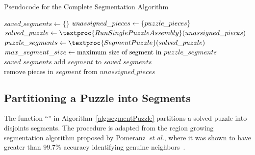 \begin{algorithm}[tb]
\caption{Pseudocode for the Complete Segmentation Algorithm}\label{alg:segmentation}
\begin{algorithmic}[1]
    \State $saved\_segments \gets \{ \}$
    \State $unassigned\_pieces \gets \{ puzzle\hspace{-0.8pt}\_pieces \}$
    \Loop
        \State $solved\_puzzle \gets \textproc{RunSinglePuzzleAssembly}(unassigned\_pieces)$
        \State $puzzle\hspace{-0.8pt}\_segments \gets \textproc{SegmentPuzzle}(solved\_puzzle)$
        \State $max\_segment\_size \gets \text{maximum size of segment in } puzzle\hspace{-0.8pt}\_segments$
			\State \Return $saved\_segments$
        \EndIf
                \State $\text{add } segment \text{ to } saved\_segments$
                \State $\text{remove pieces in } segment \text{ from } unassigned\_pieces$
            \EndIf
        \EndFor
	\EndLoop
\EndFunction
\end{algorithmic}
\end{algorithm}

\subsection{Partitioning a Puzzle into Segments}\label{sec:segmentPuzzle}

The function ``'' in Algorithm~\ref{alg:segmentPuzzle} partitions a solved puzzle into disjoints segments.  The procedure is adapted from the region growing segmentation algorithm proposed by Pomeranz~\textit{et al.}, where it was shown to have greater than 99.7\% accuracy identifying genuine neighbors~\cite{pomeranz2011}. 

